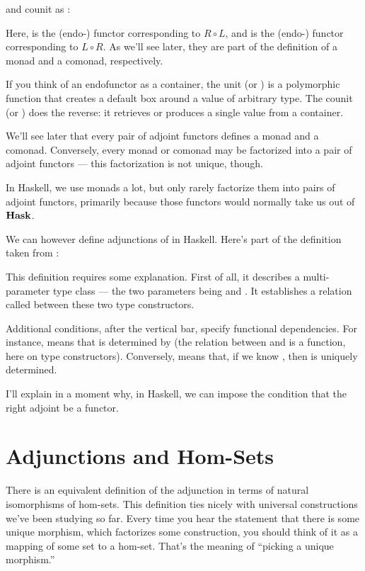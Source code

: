 and counit as :

Here,  is the (endo-) functor corresponding to $R \circ L$,
and  is the (endo-) functor corresponding to $L \circ R$. As
we'll see later, they are part of the definition of a monad and a
comonad, respectively.

If you think of an endofunctor as a container, the unit (or
) is a polymorphic function that creates a default box
around a value of arbitrary type. The counit (or ) does
the reverse: it retrieves or produces a single value from a container.

We'll see later that every pair of adjoint functors defines a monad and
a comonad. Conversely, every monad or comonad may be factorized into a
pair of adjoint functors --- this factorization is not unique, though.

In Haskell, we use monads a lot, but only rarely factorize them into
pairs of adjoint functors, primarily because those functors would
normally take us out of $\mathbf{Hask}$.

We can however define adjunctions of  in Haskell.
Here's part of the definition taken from
:

This definition requires some explanation. First of all, it describes a
multi-parameter type class --- the two parameters being  and
. It establishes a relation called  between
these two type constructors.

Additional conditions, after the vertical bar, specify functional
dependencies. For instance,  means that
 is determined by  (the relation between 
and  is a function, here on type constructors). Conversely,
 means that, if we know , then
 is uniquely determined.

I'll explain in a moment why, in Haskell, we can impose the condition
that the right adjoint  be a  functor.

\section{Adjunctions and Hom-Sets}

There is an equivalent definition of the adjunction in terms of natural
isomorphisms of hom-sets. This definition ties nicely with universal
constructions we've been studying so far. Every time you hear the
statement that there is some unique morphism, which factorizes some
construction, you should think of it as a mapping of some set to a
hom-set. That's the meaning of ``picking a unique morphism.''

